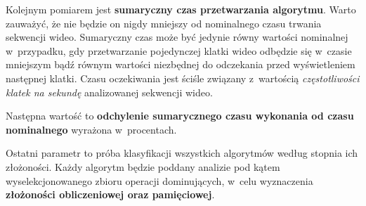     Kolejnym pomiarem jest \textbf{sumaryczny czas przetwarzania algorytmu}. Warto zauważyć, że nie będzie on nigdy mniejszy od nominalnego czasu trwania sekwencji wideo. Sumaryczny czas może być jedynie równy wartości nominalnej w~przypadku, gdy przetwarzanie pojedynczej klatki wideo odbędzie się w~czasie mniejszym bądź równym wartości niezbędnej do odczekania przed wyświetleniem następnej klatki. Czasu oczekiwania jest ściśle związany z~wartością \textit{częstotliwości klatek na sekundę} analizowanej sekwencji wideo.

    Następna wartość to \textbf{odchylenie sumarycznego czasu wykonania od czasu nominalnego} wyrażona w~procentach.

    Ostatni parametr to próba klasyfikacji wszystkich algorytmów według stopnia ich złożoności. Każdy algorytm będzie poddany analizie pod kątem wyselekcjonowanego zbioru operacji dominujących, w~celu wyznaczenia \textbf{złożoności obliczeniowej oraz pamięciowej}.